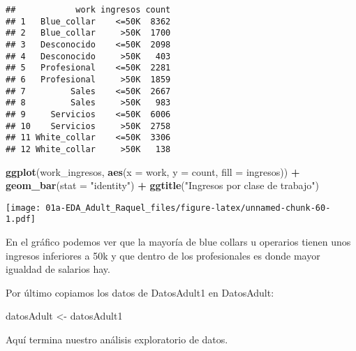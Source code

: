 \documentclass[]{article}
\newenvironment{Shaded}{\begin{snugshade}}{\end{snugshade}}
\newcommand{\DataTypeTok}[1]{\textcolor[rgb]{0.13,0.29,0.53}{#1}}
\newcommand{\KeywordTok}[1]{\textcolor[rgb]{0.13,0.29,0.53}{\textbf{#1}}}
\newcommand{\NormalTok}[1]{#1}
\newcommand{\OperatorTok}[1]{\textcolor[rgb]{0.81,0.36,0.00}{\textbf{#1}}}
\newcommand{\StringTok}[1]{\textcolor[rgb]{0.31,0.60,0.02}{#1}}
\begin{document}
\begin{verbatim}
##            work ingresos count
## 1   Blue_collar    <=50K  8362
## 2   Blue_collar     >50K  1700
## 3   Desconocido    <=50K  2098
## 4   Desconocido     >50K   403
## 5   Profesional    <=50K  2281
## 6   Profesional     >50K  1859
## 7         Sales    <=50K  2667
## 8         Sales     >50K   983
## 9     Servicios    <=50K  6006
## 10    Servicios     >50K  2758
## 11 White_collar    <=50K  3306
## 12 White_collar     >50K   138
\end{verbatim}

\begin{Shaded}
\begin{Highlighting}[]
\KeywordTok{ggplot}\NormalTok{(work\_ingresos, }\KeywordTok{aes}\NormalTok{(}\DataTypeTok{x =}\NormalTok{ work, }\DataTypeTok{y =}\NormalTok{ count, }\DataTypeTok{fill =}\NormalTok{ ingresos)) }\OperatorTok{+}\StringTok{ }\KeywordTok{geom\_bar}\NormalTok{(}\DataTypeTok{stat =} \StringTok{"identity"}\NormalTok{) }\OperatorTok{+}\StringTok{ }\KeywordTok{ggtitle}\NormalTok{(}\StringTok{"Ingresos por clase de trabajo"}\NormalTok{)}
\end{Highlighting}
\end{Shaded}

\texttt{[image: 01a-EDA\_Adult\_Raquel\_files/figure-latex/unnamed-chunk-60-1.pdf]}

En el gráfico podemos ver que la mayoría de blue collars u operarios
tienen unos ingresos inferiores a 50k y que dentro de los profesionales
es donde mayor igualdad de salarios hay.

Por último copiamos los datos de DatosAdult1 en DatosAdult:

\begin{Shaded}
\begin{Highlighting}[]
\NormalTok{datosAdult \textless{}{-}}\StringTok{ }\NormalTok{datosAdult1}
\end{Highlighting}
\end{Shaded}

Aquí termina nuestro análisis exploratorio de datos.
\end{document}

